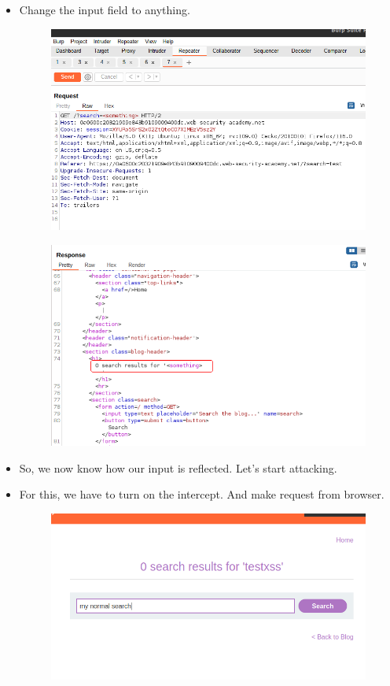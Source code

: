 \documentclass[
	a4paper, %
	12pt, %
]{CSSullivanBusinessReport}
\begin{document}
\begin{fullwidth}
\begin{itemize}
\begin{figure}[H]
    
\end{figure}
    \item Change the input field to anything.
    \begin{figure}[H]
        \centering
        \includegraphics[width=1\linewidth]{Images//Reflected XSS/something.png}       
    \end{figure}
\begin{figure}[H]
    \centering
    \includegraphics[width=1\linewidth]{Images//Reflected XSS/response-1.png}
\end{figure}

    \item So, we now know how our input is reflected. Let’s start attacking. 
    \item For this, we have to turn on the intercept. And make request from browser.
    \begin{figure}[H]
        \centering
        \includegraphics[width=0.75\linewidth]{Images//Reflected XSS/request.png}
        

\end{figure}
\end{itemize}
\end{fullwidth}
\end{document}
